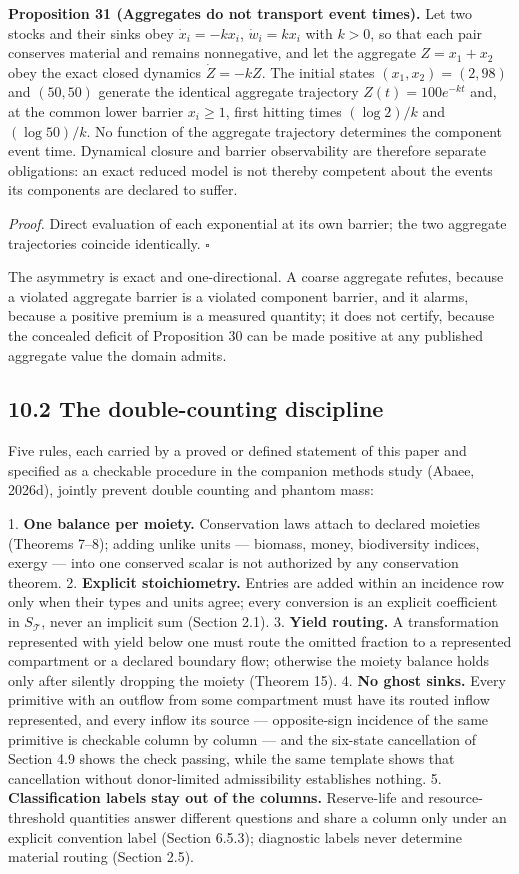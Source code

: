 \documentclass[11pt]{article}
\begin{document}
\textbf{Proposition 31 (Aggregates do not transport event times).} Let two stocks and their sinks obey \(\dot x_i=-kx_i\), \(\dot w_i=kx_i\) with \(k>0\), so that each pair conserves material and remains nonnegative, and let the aggregate \(Z=x_1+x_2\) obey the exact closed dynamics \(\dot Z=-kZ\). The initial states \((x_1,x_2)=(2,98)\) and \((50,50)\) generate the identical aggregate trajectory \(Z(t)=100e^{-kt}\) and, at the common lower barrier \(x_i\ge1\), first hitting times \((\log2)/k\) and \((\log50)/k\). No function of the aggregate trajectory determines the component event time. Dynamical closure and barrier observability are therefore separate obligations: an exact reduced model is not thereby competent about the events its components are declared to suffer.

\emph{Proof.} Direct evaluation of each exponential at its own barrier; the two aggregate trajectories coincide identically. \(\square\)

The asymmetry is exact and one-directional. A coarse aggregate refutes, because a violated aggregate barrier is a violated component barrier, and it alarms, because a positive premium is a measured quantity; it does not certify, because the concealed deficit of Proposition 30 can be made positive at any published aggregate value the domain admits.

\subsection*{10.2 The double-counting discipline}\label{102-the-double-counting-discipline}

Five rules, each carried by a proved or defined statement of this paper and specified as a checkable procedure in the companion methods study (Abaee, 2026d), jointly prevent double counting and phantom mass:

1. \textbf{One balance per moiety.} Conservation laws attach to declared moieties (Theorems 7--8); adding unlike units --- biomass, money, biodiversity indices, exergy --- into one conserved scalar is not authorized by any conservation theorem. 2. \textbf{Explicit stoichiometry.} Entries are added within an incidence row only when their types and units agree; every conversion is an explicit coefficient in \(S_{\mathcal{T}}\), never an implicit sum (Section 2.1). 3. \textbf{Yield routing.} A transformation represented with yield below one must route the omitted fraction to a represented compartment or a declared boundary flow; otherwise the moiety balance holds only after silently dropping the moiety (Theorem 15). 4. \textbf{No ghost sinks.} Every primitive with an outflow from some compartment must have its routed inflow represented, and every inflow its source --- opposite-sign incidence of the same primitive is checkable column by column --- and the six-state cancellation of Section 4.9 shows the check passing, while the same template shows that cancellation without donor-limited admissibility establishes nothing. 5. \textbf{Classification labels stay out of the columns.} Reserve-life and resource-threshold quantities answer different questions and share a column only under an explicit convention label (Section 6.5.3); diagnostic labels never determine material routing (Section 2.5).
\end{document}
